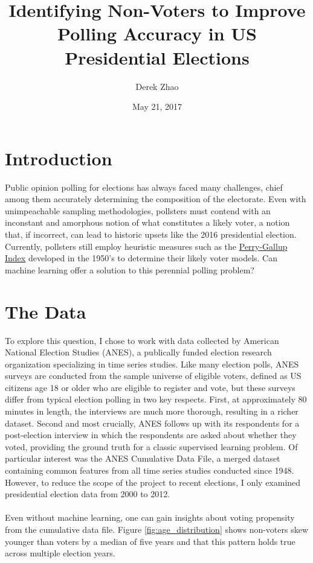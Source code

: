\documentclass{article}
\title{
	Identifying Non-Voters to Improve Polling Accuracy in US Presidential Elections}
\author{Derek Zhao}
\date{May 21, 2017}
\begin{document}
	\maketitle
	
	\section{Introduction}
	
	Public opinion polling for elections has always faced many challenges, chief among them accurately determining the composition of the electorate. Even with unimpeachable sampling methodologies, pollsters must contend with an inconstant and amorphous notion of what constitutes a likely voter, a notion that, if incorrect, can lead to historic upsets like the 2016 presidential election. Currently, pollsters still employ heuristic measures such as the \href{http://www.gallup.com/poll/111268/how-gallups-likely-voter-models-work.aspx}{Perry-Gallup Index} developed in the 1950's to determine their likely voter models. Can machine learning offer a solution to this perennial polling problem?
	
	\section{The Data}
	
	To explore this question, I chose to work with data collected by American National Election Studies (ANES), a publically funded election research organization specializing in time series studies. Like many election polls, ANES surveys are conducted from the sample universe of eligible voters, defined as US citizens age 18 or older who are eligible to register and vote, but these surveys differ from typical election polling in two key respects. First, at approximately 80 minutes in length, the interviews are much more thorough, resulting in a richer dataset. Second and most crucially, ANES follows up with its respondents for a post-election interview in which the respondents are asked about whether they voted, providing the ground truth for a classic supervised learning problem. Of particular interest was the ANES Cumulative Data File, a merged dataset containing common features from all time series studies conducted since 1948. However, to reduce the scope of the project to recent elections, I only examined presidential election data from 2000 to 2012.
	\\\\
	Even without machine learning, one can gain insights about voting propensity from the cumulative data file. Figure \ref{fig:age_distribution} shows non-voters skew younger than voters by a median of five years and that this pattern holds true across multiple election years.
	
\end{document}

